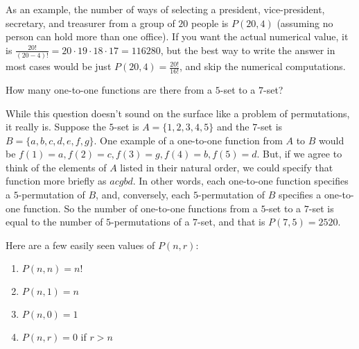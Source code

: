 \begin{exmp}\label{exmp:pres v.pres etc.}
As an example, the number of ways of selecting a president, vice-president,
secretary, and treasurer from  a group of $20$ people is $P(20,4)$ (assuming
no person can hold more than one office). If you want the actual numerical
value, it is $\displaystyle {\frac{20!}{(20-4)!}} = 20\cdot19\cdot18\cdot17
= 116280$, but the best way to write the answer in most cases would be
just $\displaystyle P(20,4)=\frac{20!}{16!}$, and skip the numerical computations.
\end{exmp}


\begin{exmp}
 How many one-to-one functions are there from a
 $5$-set to a $7$-set?
 
 While this question doesn't sound on the surface like a problem of permutations, 
 it really is. Suppose the $5$-set is $A=\{1,2,3,4,5\}$ and the $7$-set is
 $B=\{a,b,c,d,e,f,g\}$. One example of a one-to-one function from  $A$ to $B$ 
 would be $f(1) =a, f(2) = c, f(3)=g, f(4)=b, f(5) = d$. But, if we agree to
 think of the elements of $A$ listed in their natural order, we could specify
 that function more briefly as $acgbd$. In other words, each one-to-one function
 specifies a $5$-permutation of $B$, and, conversely, each $5$-permutation
 of $B$ specifies a one-to-one function.
   So the number of one-to-one functions
 from a $5$-set to a $7$-set is equal to the number of $5$-permutations of a
 $7$-set, and that is $P(7,5)=2520$. 
\end{exmp}

\begin{exmp}
 Here are a few easily seen values of $P(n,r)$:
 \begin{enumerate}
   \item $P(n,n) = n!$
   
   \item $P(n,1) = n$
   
   \item $P(n,0) = 1$
   
   \item $P(n,r) = 0$ if $r>n$
 \end{enumerate}
\end{exmp}


